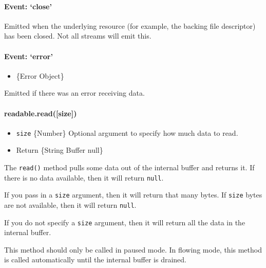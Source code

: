 \paragraph{\texorpdfstring{Event:
`close'}{Event: close}}\label{event-close}

Emitted when the underlying resource (for example, the backing file
descriptor) has been closed. Not all streams will emit this.

\paragraph{\texorpdfstring{Event:
`error'}{Event: error}}\label{event-error}

\begin{itemize}
\itemsep1pt\parskip0pt
\item
  \{Error Object\}
\end{itemize}

Emitted if there was an error receiving data.

\paragraph{readable.read({[}size{]})}\label{readable.readsize}

\begin{itemize}
\itemsep1pt\parskip0pt
\item
  \texttt{size} \{Number\} Optional argument to specify how much data to
  read.
\item
  Return \{String \textbar{} Buffer \textbar{} null\}
\end{itemize}

The \texttt{read()} method pulls some data out of the internal buffer
and returns it. If there is no data available, then it will return
\texttt{null}.

If you pass in a \texttt{size} argument, then it will return that many
bytes. If \texttt{size} bytes are not available, then it will return
\texttt{null}.

If you do not specify a \texttt{size} argument, then it will return all
the data in the internal buffer.

This method should only be called in paused mode. In flowing mode, this
method is called automatically until the internal buffer is drained.

\begin{Shaded}
\end{Shaded}

